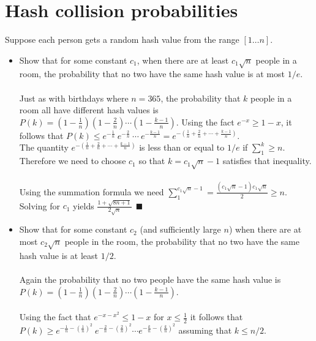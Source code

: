\documentclass[11pt]{article}
\begin{document}
\section{Hash collision probabilities}
Suppose each person gets a random hash value from the range $[1 \dots n]$.
\begin{itemize}
\item Show that for some constant $c_1$, when there are at least $c_1 \sqrt{n}$ people in a room, the probability that no two have the same hash value is at most $1/e$. \\
\\
Just as with birthdays where $n = 365$, the probability that $k$ people in a room all have different hash values is $P(k) = \left (1 - \frac{1}{n} \right )\left (1 - \frac{2}{n} \right ) \cdots \left (1 - \frac{k-1}{n} \right )$.
Using the fact $e^{-x} \ge 1 - x$, it follows that $P(k) \le e^{-\frac{1}{n}} \ e^{-\frac{2}{n}} \ \cdots \ e^{-\frac{k-1}{n}} = e^{-(\frac{1}{n} + \frac{2}{n} + \cdots + \frac{k-1}{n})}$. \\
The quantity $e^{-(\frac{1}{n} + \frac{2}{n} + \cdots + \frac{k-1}{n})}$ is less than or equal to $1/e$ if $\sum_1^k \ge n$. Therefore we need to choose $c_1$ so that $k = c_1 \sqrt{n} - 1$ satisfies that inequality. \\
\\
Using the summation formula we need $\sum_1^{c_1 \sqrt{n} - 1} = \frac{(c_1 \sqrt{n} - 1)c_1 \sqrt{n}}{2} \ge n$. \\
Solving for  $c_1$ yields  $\frac{1 + \sqrt{8n + 1}}{2 \sqrt{n}} \ \ \blacksquare $
\item Show that for some constant $c_2$ (and sufficiently large $n$) when there are at most $c_2 \sqrt{n}$ people in the room, the probability that no two have the same hash value is at least $1/2$. \\
\\
Again the probability that no two people have the same hash value is $P(k) = \left (1 - \frac{1}{n} \right )\left (1 - \frac{2}{n} \right ) \cdots \left (1 - \frac{k-1}{n} \right )$. \\
\\
Using the fact that $e^{-x-x^{2}} \le 1 - x$ for $x \le \frac{1}{2}$ it follows that \\ 
$P(k) \ge e^{- \frac{1}{n} - \left ( \frac{1}{n} \right )^{2}} \ e^{- \frac{2}{n} - \left ( \frac{2}{n} \right )^{2}} \cdots e^{- \frac{k}{n} - \left ( \frac{k}{n} \right )^{2}}$ assuming that $k \le n/2$. \\

\end{itemize}
\end{document}
